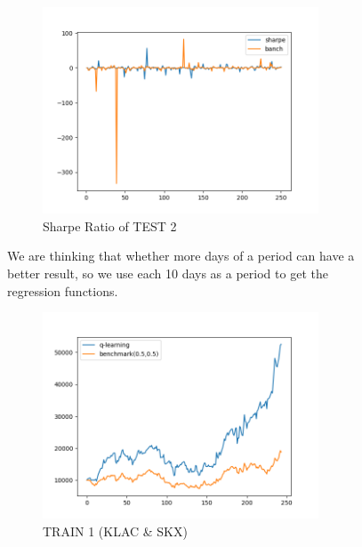 \begin{figure}[H]
\begin{subfigure}{.5\textwidth}
\end{subfigure}%
\begin{subfigure}{.5\textwidth}%
\centering
\includegraphics[clip, width=0.9\textwidth]{Graphics/TESTFC3S.png} \caption{Sharpe Ratio of TEST 2}
\end{subfigure}%
\vspace{0.7cm}
We are thinking that whether more days of a period can have a better result, so we use each 10 days as a period to get the regression functions.
\vspace{0.7cm}
\begin{subfigure}{.5\textwidth}%
\centering
\includegraphics[clip, width=0.9\textwidth]{Graphics/trainPA00WT.png} \caption{TRAIN 1 (KLAC \& SKX)} 
\end{subfigure}%
\begin{subfigure}{.5\textwidth}%
\centering

\end{subfigure}
\end{figure}
